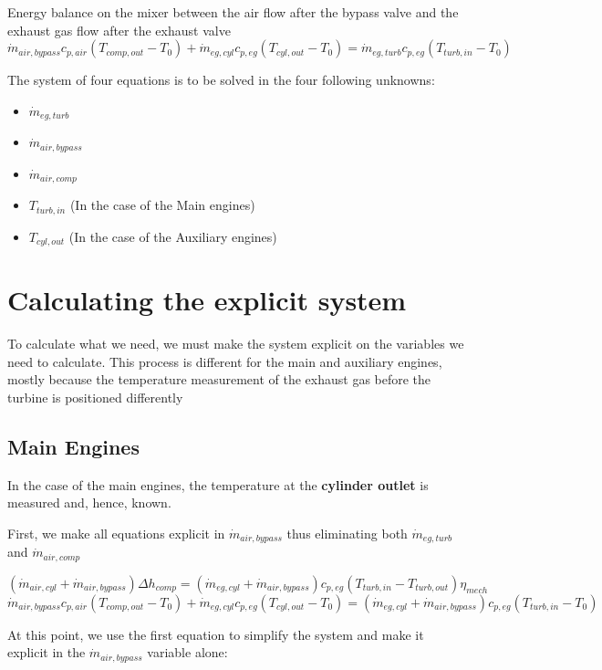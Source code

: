 \documentclass[]{article}
\begin{document}
Energy balance on the mixer between the air flow after the bypass valve and the exhaust gas flow after the exhaust valve
\begin{equation}
\dot{m}_{air,bypass} c_{p,air} (T_{comp,out} - T_0) + \dot{m}_{eg,cyl} c_{p,eg}  (T_{cyl,out} - T_0) = \dot{m}_{eg,turb} c_{p,eg} (T_{turb,in} - T_0)
\end{equation}


The system of four equations is to be solved in the four following unknowns:
\begin{itemize}
	\item $ \dot{m}_{eg,turb} $
	\item $ \dot{m}_{air,bypass} $
	\item $ \dot{m}_{air,comp} $
	\item $ T_{turb,in} $ (In the case of the Main engines)
	\item $ T_{cyl,out} $ (In the case of the Auxiliary engines)
\end{itemize}

\section{Calculating the explicit system}

To calculate what we need, we must make the system explicit on the variables we need to calculate. This process is different for the main and auxiliary engines, mostly because the temperature measurement of the exhaust gas before the turbine is positioned differently

\subsection{Main Engines}

In the case of the main engines, the temperature at the \textbf{cylinder outlet} is measured and, hence, known. 

First, we make all equations explicit in $ \dot{m}_{air,bypass} $ thus eliminating both 
$ \dot{m}_{eg,turb} $ and $ \dot{m}_{air,comp} $

$$
(\dot{m}_{air,cyl} + \dot{m}_{air,bypass}) \Delta h_{comp} = (\dot{m}_{eg,cyl} + \dot{m}_{air,bypass}) c_{p,eg} (T_{turb,in} - T_{turb,out}) \eta_{mech} 
$$
$$
\dot{m}_{air,bypass} c_{p,air} (T_{comp,out} - T_0) + \dot{m}_{eg,cyl} c_{p,eg}  (T_{cyl,out} - T_0)  = (\dot{m}_{eg,cyl} + \dot{m}_{air,bypass}) c_{p,eg} (T_{turb,in} - T_0)
$$

At this point, we use the first equation to simplify the system and make it explicit in the $ \dot{m}_{air,bypass} $ variable alone:
\end{document}
